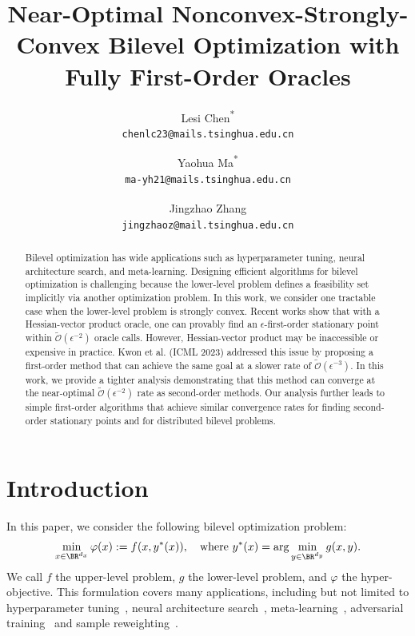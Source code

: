 \documentclass{article}
\title{Near-Optimal Nonconvex-Strongly-Convex
Bilevel Optimization with Fully First-Order Oracles}
\author{
  Lesi Chen\textsuperscript{* \dag}\\
 { \small{\texttt{chenlc23@mails.tsinghua.edu.cn}}}
  \and
  Yaohua Ma\textsuperscript{* \dag}\\
 { \small{\texttt{ma-yh21@mails.tsinghua.edu.cn}}}
  \and 
  Jingzhao Zhang\textsuperscript{ \dag}\\
 { \small{\texttt{jingzhaoz@mail.tsinghua.edu.cn}}}
}
\date{}
\begin{document}
\maketitle
\begingroup
\begin{NoHyper}
\renewcommand\thefootnote{*}
\renewcommand\thefootnote{\dag}
\end{NoHyper}
\endgroup
\begin{abstract}
Bilevel optimization has wide applications such as hyperparameter tuning, neural architecture search, and meta-learning.
Designing efficient algorithms for bilevel optimization is challenging because the lower-level problem defines a feasibility set implicitly via another optimization problem. 
In this work, we consider one
tractable case when the lower-level problem is strongly convex. Recent works show that with a Hessian-vector product oracle, one can provably find
an $\epsilon$-first-order stationary point
within $\tilde{\mathcal{O}}(\epsilon^{-2})$ oracle calls. However, Hessian-vector product may be inaccessible or expensive in practice.
Kwon et al. (ICML 2023) addressed this issue by proposing a  first-order method that can achieve the same goal at a slower
rate of $\tilde{\mathcal{O}}(\epsilon^{-3})$. 
In this work, we provide a tighter analysis demonstrating that this method can converge at the near-optimal $\tilde {\mathcal{O}}(\epsilon^{-2})$ rate as second-order methods.
Our analysis further leads to
simple first-order algorithms that achieve similar convergence rates for finding second-order stationary points and for distributed bilevel problems.
\end{abstract}

\section{Introduction}

In this paper, we consider the following bilevel optimization problem:
\begin{align} \label{hyper-refo}
    \min_{x \in \BR^{d_x}} \varphi(x) := f(x,y^*(x)) , \quad {\rm where}~ y^*(x) = \arg \min_{y \in \BR^{d_y}} g(x,y).
\end{align}
We call $f$ the upper-level problem, $g$ the lower-level problem, and $\varphi$ the hyper-objective.
This formulation covers many applications, including but not limited to hyperparameter tuning~\citep{franceschi2018bilevel,pedregosa2016hyperparameter,gao2022value,bae2020delta,mackay2018self}, neural architecture search~\citep{liu2018darts,wang2022zarts,zoph2016neural,zhang2021idarts}, meta-learning~\citep{finn2017model,fallah2020convergence,andrychowicz2016learning,mishchenko2023convergence,rajeswaran2019meta,chandra2022gradient,ji2022theoretical,zhou2019efficient}, adversarial training~\citep{zhang2022revisiting,bruckner2011stackelberg,wang2021fast,bishop2020optimal,wang2022solving,robey2023adversarial} and sample reweighting~\citep{gao2022self,zhou2022model,ren2018learning,yong2022holistic,shu2019meta,li2022ood}.
\end{document}
